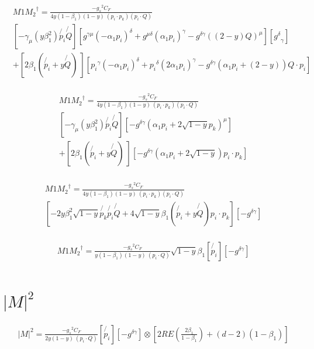 \begin{equation}
\begin{split}
&M1{M_2}^{\dagger}=\frac{-{g_s}^2 C_F}{4 y(1-\beta_1) (1-y)\:(p_i \cdot p_k)(p_i \cdot Q)}\\
&[-\gamma_{\mu}(y\beta_1^2)\not{p_i}\not{Q}][ g^{{{\gamma}}{{\mu}}}(-\alpha_1p_i)^{\delta}+g^{{{\mu}}{{\delta}}}(\alpha_1p_i )^{{\gamma}}-g^{\delta{{\gamma}}}((2-y)Q)^{{\mu}}][{g^{\delta}}_{\gamma}]\\
&+[2\beta_1(\not{p_i}+y\not{Q})\:][{p_i}^{\gamma} (-\alpha_1p_i)^{\delta}+{p_i}^{\delta}(2\alpha_1p_i )^{{\gamma}}-g^{\delta{{\gamma}}}(\alpha_1p_i+(2-y))Q\cdot p_i]\\
\end{split}
\end{equation}

\begin{equation}
\begin{split}
&M1{M_2}^{\dagger}=\frac{-{g_s}^2 C_F}{4 y(1-\beta_1) (1-y)\:(p_i \cdot p_k)(p_i \cdot Q)}\\
&[-\gamma_{\mu}(y\beta_1^2)\not{p_i}\not{Q}][-g^{\delta{{\gamma}}}(\alpha_1p_i+2\sqrt{1-y} p_k)^{{\mu}}]\\
&+[2\beta_1(\not{p_i}+y\not{Q})\:][-g^{\delta{{\gamma}}}(\alpha_1p_i+2\sqrt{1-y})p_i\cdot p_k]\\
\end{split}
\end{equation}

\begin{equation}
\begin{split}
&M1{M_2}^{\dagger}=\frac{-{g_s}^2 C_F}{4 y(1-\beta_1) (1-y)\:(p_i \cdot p_k)(p_i \cdot Q)}\\
&[-2y\beta_1^2\sqrt{1-y} \not{p_k}\not{p_i}\not{Q}+4\sqrt{1-y}\beta_1(\not{p_i}+y\not{Q})p_i\cdot p_k][-g^{\delta{{\gamma}}}]\\
\end{split}
\end{equation}

\begin{equation}
\begin{split}
&M1{M_2}^{\dagger}=\frac{-{g_s}^2 C_F}{y(1-\beta_1) (1-y)\:(p_i \cdot Q)}\sqrt{1-y}\beta_1[\not{p_i}][-g^{\delta{{\gamma}}}]\\
\end{split}
\end{equation}

\section{$ |M|^{2} $}

\begin{equation}
\begin{split}
&|M|^{2}=\frac{-{g_s}^2 C_F}{2y (1-y)\:(p_i \cdot Q)}[\not{p_i}][-g^{\delta{{\gamma}}}]\otimes [2RE(\frac{2\beta_1}{1-\beta_1})+(d-2)(1-\beta_1)]\\
\end{split}
\end{equation}

















